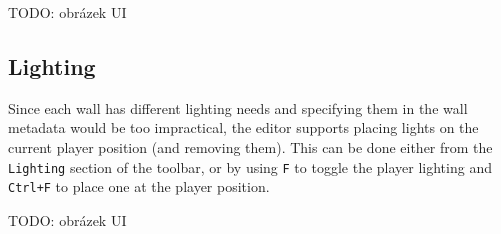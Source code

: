TODO: obrázek UI

\subsection{Lighting}
Since each wall has different lighting needs and specifying them in the wall metadata would be too impractical, the editor supports placing lights on the current player position (and removing them).
This can be done either from the \verb|Lighting| section of the toolbar, or by using \verb|F| to toggle the player lighting and \verb|Ctrl+F| to place one at the player position.

TODO: obrázek UI
